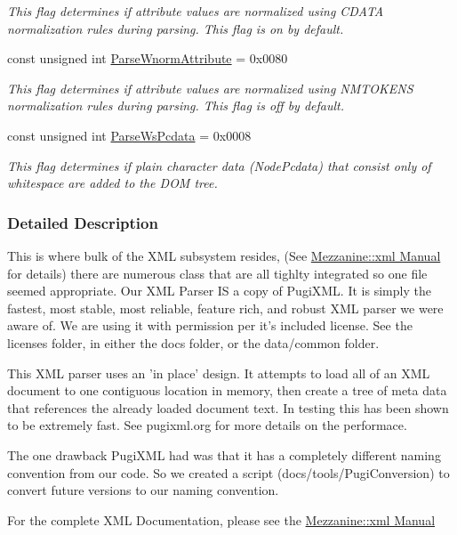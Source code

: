 \begin{DoxyCompactItemize}
\begin{DoxyCompactList}\small\item\em This flag determines if attribute values are normalized using CDATA normalization rules during parsing. This flag is on by default. \item\end{DoxyCompactList}\item 
\hypertarget{namespaceMezzanine_1_1xml_ad805b2d64aacf612603631761f3317d6}{
const unsigned int \hyperlink{namespaceMezzanine_1_1xml_ad805b2d64aacf612603631761f3317d6}{ParseWnormAttribute} = 0x0080}
\label{namespaceMezzanine_1_1xml_ad805b2d64aacf612603631761f3317d6}

\begin{DoxyCompactList}\small\item\em This flag determines if attribute values are normalized using NMTOKENS normalization rules during parsing. This flag is off by default. \item\end{DoxyCompactList}\item 
const unsigned int \hyperlink{namespaceMezzanine_1_1xml_ad1540f35280d1c679102542125ed94ac}{ParseWsPcdata} = 0x0008
\begin{DoxyCompactList}\small\item\em This flag determines if plain character data (NodePcdata) that consist only of whitespace are added to the DOM tree. \item\end{DoxyCompactList}\end{DoxyCompactItemize}


\subsubsection{Detailed Description}
This is where bulk of the XML subsystem resides, (See \hyperlink{XMLManual}{Mezzanine::xml Manual} for details) there are numerous class that are all tighlty integrated so one file seemed appropriate. Our XML Parser IS a copy of PugiXML. It is simply the fastest, most stable, most reliable, feature rich, and robust XML parser we were aware of. We are using it with permission per it's included license. See the licenses folder, in either the docs folder, or the data/common folder. \par
 \par
 This XML parser uses an 'in place' design. It attempts to load all of an XML document to one contiguous location in memory, then create a tree of meta data that references the already loaded document text. In testing this has been shown to be extremely fast. See pugixml.org for more details on the performace. \par
 \par
 The one drawback PugiXML had was that it has a completely different naming convention from our code. So we created a script (docs/tools/PugiConversion) to convert future versions to our naming convention. \par
 \par
 For the complete XML Documentation, please see the \hyperlink{XMLManual}{Mezzanine::xml Manual} 

